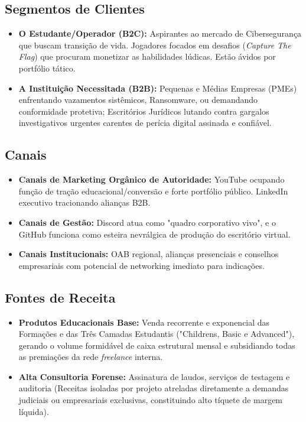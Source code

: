 \documentclass[../main.tex]{subfiles}
\begin{document}
\subsection*{Segmentos de Clientes}
\begin{itemize}
  \item \textbf{O Estudante/Operador (B2C):} Aspirantes ao mercado de Cibersegurança que buscam transição de vida. Jogadores focados em desafios (\textit{Capture The Flag}) que procuram monetizar as habilidades lúdicas. Estão ávidos por portfólio tático.
  \item \textbf{A Instituição Necessitada (B2B):} Pequenas e Médias Empresas (PMEs) enfrentando vazamentos sistêmicos, Ransomware, ou demandando conformidade protetiva; Escritórios Jurídicos lutando contra gargalos investigativos urgentes carentes de perícia digital assinada e confiável.
\end{itemize}

\subsection*{Canais}
\begin{itemize}
  \item \textbf{Canais de Marketing Orgânico de Autoridade:} YouTube ocupando função de tração educacional/conversão e forte portfólio público. LinkedIn executivo tracionando alianças B2B.
  \item \textbf{Canais de Gestão:} Discord atua como "quadro corporativo vivo", e o GitHub funciona como esteira nevrálgica de produção do escritório virtual.
  \item \textbf{Canais Institucionais:} OAB regional, alianças presenciais e conselhos empresariais com potencial de networking imediato para indicações.
\end{itemize}

\subsection*{Fontes de Receita}
\begin{itemize}
  \item \textbf{Produtos Educacionais Base:} Venda recorrente e exponencial das Formações e das Três Camadas Estudantis ("Childrens, Basic e Advanced"), gerando o volume formidável de caixa estrutural mensal e subsidiando todas as premiações da rede \textit{freelance} interna.
  \item \textbf{Alta Consultoria Forense:} Assinatura de laudos, serviços de testagem e auditoria (Receitas isoladas por projeto atreladas diretamente a demandas judiciais ou empresariais exclusivas, constituindo alto tíquete de margem líquida).
\end{itemize}
\end{document}
